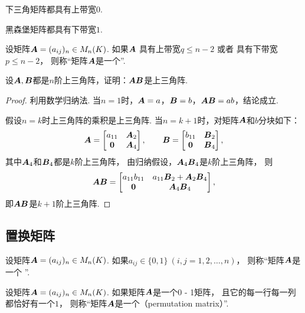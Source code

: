 \begin{example}
下三角矩阵都具有上带宽\(0\).
\end{example}

\begin{example}
黑森堡矩阵都具有下带宽\(1\).
\end{example}

\begin{definition}
设矩阵\(\boldsymbol{A}=(a_{ij})_n \in M_n(K)\).
如果\(\boldsymbol{A}\)
具有上带宽\(q \leq n-2\)
或者
具有下带宽\(p \leq n-2\)，
则称“矩阵\(\boldsymbol{A}\)是一个”.
\end{definition}

\begin{example}
设\(\boldsymbol{A},\boldsymbol{B}\)都是\(n\)阶上三角阵，证明：\(\boldsymbol{A}\boldsymbol{B}\)是上三角阵.
\begin{proof}
利用数学归纳法.
当\(n=1\)时，\(\boldsymbol{A}=a\)，\(\boldsymbol{B}=b\)，\(\boldsymbol{A}\boldsymbol{B} = ab\)，结论成立.

假设\(n=k\)时上三角阵的乘积是上三角阵.
当\(n=k+1\)时，对矩阵\(\boldsymbol{A}\)和\(b\)分块如下：\begin{equation*}
	\boldsymbol{A} = \begin{bmatrix}
		a_{11} & \boldsymbol{A}_2 \\
		\boldsymbol0 & \boldsymbol{A}_4
	\end{bmatrix},
	\qquad
	\boldsymbol{B} = \begin{bmatrix}
		b_{11} & \boldsymbol{B}_2 \\
		\boldsymbol0 & \boldsymbol{B}_4
	\end{bmatrix},
\end{equation*}
其中\(\boldsymbol{A}_4\)和\(\boldsymbol{B}_4\)都是\(k\)阶上三角阵，
由归纳假设，\(\boldsymbol{A}_4 \boldsymbol{B}_4\)是\(k\)阶上三角阵，
则\begin{equation*}
	\boldsymbol{A}\boldsymbol{B} = \begin{bmatrix}
		a_{11} b_{11} & a_{11} \boldsymbol{B}_2 + \boldsymbol{A}_2 \boldsymbol{B}_4 \\
		\boldsymbol0 & \boldsymbol{A}_4 \boldsymbol{B}_4
	\end{bmatrix},
\end{equation*}
即\(\boldsymbol{A}\boldsymbol{B}\)是\(k+1\)阶上三角阵.
\end{proof}
\end{example}

\subsection{置换矩阵}
\begin{definition}
设矩阵\(\boldsymbol{A}=(a_{ij})_n \in M_n(K)\).
如果\(a_{ij} \in \{0,1\}\ (i,j=1,2,\dotsc,n)\)，
则称“矩阵\(\boldsymbol{A}\)是一个 ”.
\end{definition}
\begin{definition}
设矩阵\(\boldsymbol{A}=(a_{ij})_n \in M_n(K)\).
如果矩阵\(\boldsymbol{A}\)是一个0 - 1矩阵，
且它的每一行每一列都恰好有一个\(1\)，
则称“矩阵\(\boldsymbol{A}\)是一个（permutation matrix）”.
\end{definition}

